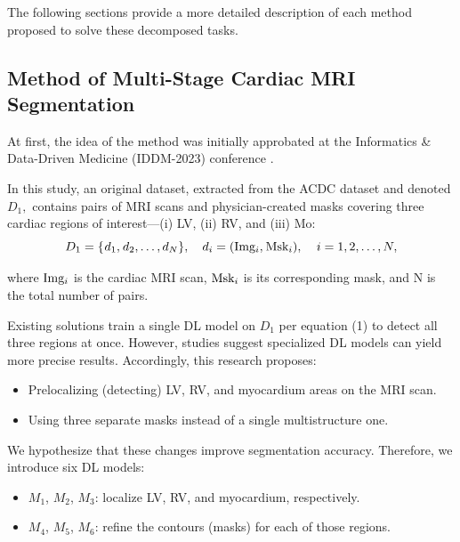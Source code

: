 \documentclass[fleqn,10pt]{wlscirep}
\begin{document}
The following sections provide a more detailed description of each method proposed to solve these decomposed tasks.

\subsection*{Method of Multi-Stage Cardiac MRI Segmentation}

At first, the idea of the method was initially approbated at the Informatics \& Data-Driven Medicine (IDDM-2023) conference \cite{Slobodzian:2024}.

In this study, an original dataset, extracted from the ACDC dataset and denoted \({D_1},\) contains pairs of MRI scans and physician-created masks covering three cardiac regions of interest---(i) LV, (ii) RV, and (iii) Mo:
\begin{equation}
    {D_1} = \{ {\mkern 1mu} {d_1},{\mkern 1mu} {d_2}, \ldots ,{d_N}\} ,\quad {d_i} = ({\rm{Im}}{{\rm{g}}_i},{\mkern 1mu} {\rm{Ms}}{{\rm{k}}_i}),\quad {\kern 1pt} i = 1,2, \ldots ,N,
\end{equation}

where \({\rm{Im}}{{\rm{g}}_i}\) is the cardiac MRI scan, \({\rm{Ms}}{{\rm{k}}_i}\) is its corresponding mask, and N is the total number of pairs.

Existing solutions train a single DL model on \({D_1}\) per equation (1) to detect all three regions at once. However, studies \cite{Wehbe:2023,Pandey:2023} suggest specialized DL models can yield more precise results. Accordingly, this research proposes:

\begin{itemize}
    \item Prelocalizing (detecting) LV, RV, and myocardium areas on the MRI scan.
    \item Using three separate masks instead of a single multistructure one.
\end{itemize}

We hypothesize that these changes improve segmentation accuracy. Therefore, we introduce six DL models:

\begin{itemize}
    \item \({M_1}\), \({M_2}\), \({M_3}\): localize LV, RV, and myocardium, respectively.
    \item \({M_4}\), \({M_5}\), \({M_6}\): refine the contours (masks) for each of those regions.
\end{itemize}
\end{document}
